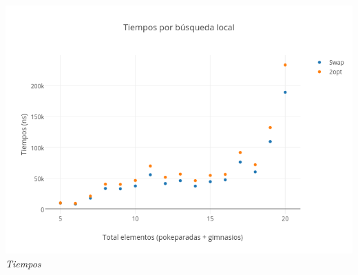 \begin{figure}[h] 
 \centering
       \label{fig:gruposDist1}
    \label{fig:gruposMejora1}
    \end{figure}
 
   \vspace*{0.3cm} \vspace*{0.3cm}
  \begin{center}
	\includegraphics[scale=0.40]{./EJ3/tiemposLocales20cuad.png}
	\label{fig:gruposTiempos1}	
	\\{\textit{Tiempos}}
  \end{center}
  \vspace*{0.3cm} 

